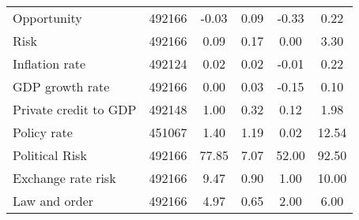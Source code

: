 \begin{table}[htbp]
\begin{tabular}{l*{1}{ccccc}}
Opportunity         &      492166&       -0.03&        0.09&       -0.33&        0.22\\
Risk                &      492166&        0.09&        0.17&        0.00&        3.30\\
Inflation rate      &      492124&        0.02&        0.02&       -0.01&        0.22\\
GDP growth rate     &      492166&        0.00&        0.03&       -0.15&        0.10\\
Private credit to GDP&      492148&        1.00&        0.32&        0.12&        1.98\\
Policy rate         &      451067&        1.40&        1.19&        0.02&       12.54\\
Political Risk      &      492166&       77.85&        7.07&       52.00&       92.50\\
Exchange rate risk  &      492166&        9.47&        0.90&        1.00&       10.00\\
Law and order       &      492166&        4.97&        0.65&        2.00&        6.00\\
\hline\hline
\end{tabular}
\end{table}

